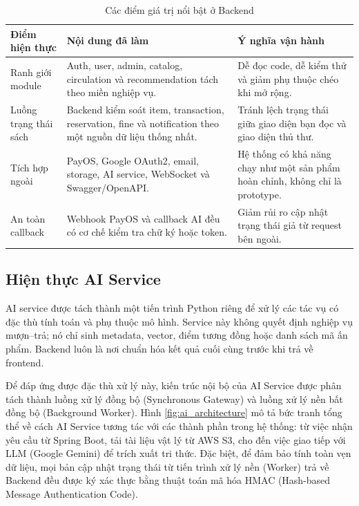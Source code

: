 \begin{table}[H]
\centering
\small
\begin{tabularx}{\textwidth}{|p{3.4cm}|X|p{3.4cm}|}
\hline
\textbf{Điểm hiện thực} & \textbf{Nội dung đã làm} & \textbf{Ý nghĩa vận hành} \\
\hline
Ranh giới module &
Auth, user, admin, catalog, circulation và recommendation tách theo miền nghiệp vụ. &
Dễ đọc code, dễ kiểm thử và giảm phụ thuộc chéo khi mở rộng. \\
\hline
Luồng trạng thái sách &
Backend kiểm soát item, transaction, reservation, fine và notification theo một nguồn dữ liệu thống nhất. &
Tránh lệch trạng thái giữa giao diện bạn đọc và giao diện thủ thư. \\
\hline
Tích hợp ngoài &
PayOS, Google OAuth2, email, storage, AI service, WebSocket và Swagger/OpenAPI. &
Hệ thống có khả năng chạy như một sản phẩm hoàn chỉnh, không chỉ là prototype. \\
\hline
An toàn callback &
Webhook PayOS và callback AI đều có cơ chế kiểm tra chữ ký hoặc token. &
Giảm rủi ro cập nhật trạng thái giả từ request bên ngoài. \\
\hline
\end{tabularx}
\caption{Các điểm giá trị nổi bật ở Backend}
\label{tab:be_value_highlights}
\end{table}

\subsection{Hiện thực AI Service}

AI service được tách thành một tiến trình Python riêng để xử lý các tác vụ có
đặc thù tính toán và phụ thuộc mô hình. Service này không quyết định nghiệp vụ
mượn--trả; nó chỉ sinh metadata, vector, điểm tương đồng hoặc danh sách mã ấn
phẩm. Backend luôn là nơi chuẩn hóa kết quả cuối cùng trước khi trả về frontend.

Để đáp ứng được đặc thù xử lý này, kiến trúc nội bộ của AI Service được phân tách thành luồng xử lý đồng bộ (Synchronous Gateway) và luồng xử lý nền bất đồng bộ (Background Worker). Hình \ref{fig:ai_architecture} mô tả bức tranh tổng thể về cách AI Service tương tác với các thành phần trong hệ thống: từ việc nhận yêu cầu từ Spring Boot, tải tài liệu vật lý từ AWS S3, cho đến việc giao tiếp với LLM (Google Gemini) để trích xuất tri thức. Đặc biệt, để đảm bảo tính toàn vẹn dữ liệu, mọi bản cập nhật trạng thái từ tiến trình xử lý nền (Worker) trả về Backend đều được ký xác thực bằng thuật toán mã hóa HMAC (Hash-based Message Authentication Code).

